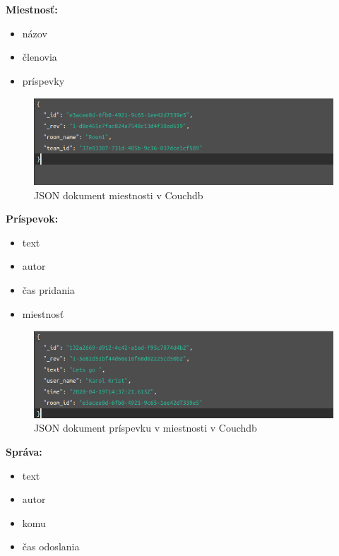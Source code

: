 \textbf{Miestnosť:}
\indent\begin{itemize}
    \item názov
    \item členovia 
    \item príspevky 
\end{itemize}

\begin{figure}[H]
    \centering
    \includegraphics[scale=0.50]{img/imp/db_room.png}
    \caption{JSON dokument miestnosti v Couchdb}
    \label{fig:db_room}
\end{figure}

\textbf{Príspevok:}
\indent\begin{itemize}
    \item text
    \item autor
    \item čas pridania
    \item miestnosť
\end{itemize}

\begin{figure}[H]
    \centering
    \includegraphics[scale=0.50]{img/imp/db_feed.png}
    \caption{JSON dokument príspevku v miestnosti v Couchdb}
    \label{fig:db_feed}
\end{figure}

\textbf{Správa:}
\indent\begin{itemize}
    \item text
    \item autor 
    \item komu
    \item čas odoslania
\end{itemize}

